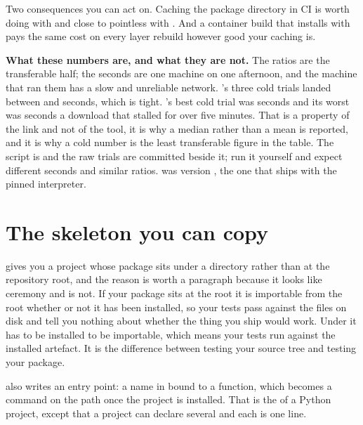 Two consequences you can act on. Caching the package directory in CI is worth
doing with  and close to pointless with . And a container
build that installs with  pays the same cost on every layer rebuild
however good your caching is.

\begin{note}
\textbf{What these numbers are, and what they are not.} The ratios are the
transferable half; the seconds are one machine on one afternoon, and the
machine that ran them has a slow and unreliable network. 's three
cold trials landed between  and
 seconds, which is tight. 's best cold trial
was  seconds and its worst was 
seconds \dash{} a download that stalled for over five minutes. That is a property of
the link and not of the tool, it is why a median rather than a mean is
reported, and it is why a cold number is the least transferable figure in the
table. The script is  and the raw trials are
committed beside it; run it yourself and expect different seconds and similar
ratios.  was version , the one that ships
with the pinned interpreter.
\end{note}

\section{The skeleton you can copy}
\label{sec:ch02-skeleton}

\noindent
{} gives you a project whose package sits under a 
directory rather than at the repository root, and the reason is worth a
paragraph
because it looks like ceremony and is not. If your package sits at the root it
is importable from the root whether or not it has been installed, so your tests
pass against the files on disk and tell you nothing about whether the thing you
ship would work. Under  it has to be installed to be importable,
which means your tests run against the installed artefact. It is the difference
between testing your source tree and testing your package.

 also writes an entry point: a name in 
bound to a function, which becomes a command on the path once the project is
installed. That is the  of a Python project, except that a
project can declare several and each is one line.

